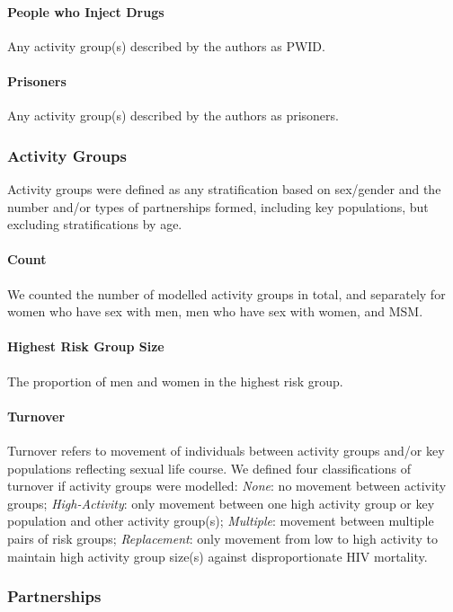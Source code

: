 \paragraph{People who Inject Drugs}
Any activity group(s) described by the authors as PWID.
\paragraph{Prisoners}
Any activity group(s) described by the authors as prisoners.
\subsubsection{Activity Groups}
\label{aaa:defs:act}
Activity groups were defined as any stratification based on
sex/gender and the number and/or types of partnerships formed, including key populations,
but excluding stratifications by age.
\paragraph{Count}
We counted the number of modelled activity groups in total,
and separately for women who have sex with men, men who have sex with women, and MSM.
\paragraph{Highest Risk Group Size}
The proportion of men and women in the highest risk group.
\paragraph{Turnover}
Turnover refers to movement of individuals between
activity groups and/or key populations reflecting sexual life course.
We defined four classifications of turnover if activity groups were modelled:
\emph{None}: no movement between activity groups;
\emph{High-Activity}: only movement between one high activity group or key population
and other activity group(s);
\emph{Multiple}: movement between multiple pairs of risk groups;
\emph{Replacement}: only movement from low to high activity
to maintain high activity group size(s) against disproportionate HIV mortality.
\subsubsection{Partnerships}
\label{aaa:defs:pt}
